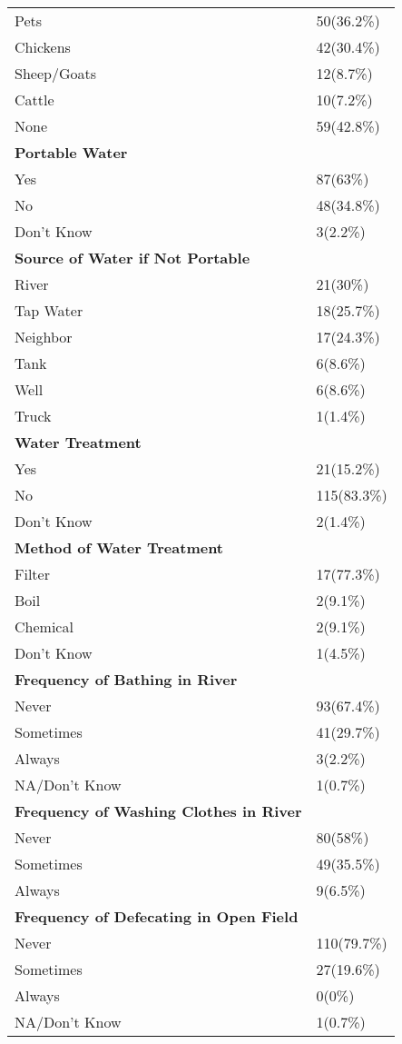 \documentclass[10pt,letterpaper]{article}
\begin{document}
\begin{longtable}{ll}
Pets & 50(36.2\%) \\
Chickens & 42(30.4\%) \\
Sheep/Goats & 12(8.7\%) \\
Cattle & 10(7.2\%) \\
None & 59(42.8\%) \\
\midrule
\textbf{Portable Water} & \\
Yes & 87(63\%) \\
No & 48(34.8\%) \\
Don't Know & 3(2.2\%) \\
\midrule
\textbf{Source of Water if Not Portable} & \\
River & 21(30\%) \\
Tap Water & 18(25.7\%) \\
Neighbor & 17(24.3\%) \\
Tank & 6(8.6\%) \\
Well & 6(8.6\%) \\
Truck & 1(1.4\%) \\
\midrule
\textbf{Water Treatment} & \\
Yes & 21(15.2\%) \\
No & 115(83.3\%) \\
Don't Know & 2(1.4\%) \\
\midrule
\textbf{Method of Water Treatment} & \\
Filter & 17(77.3\%) \\
Boil & 2(9.1\%) \\
Chemical & 2(9.1\%) \\
Don't Know & 1(4.5\%) \\
\midrule
\textbf{Frequency of Bathing in River} & \\
Never & 93(67.4\%) \\
Sometimes & 41(29.7\%) \\
Always & 3(2.2\%) \\
NA/Don't Know & 1(0.7\%) \\
\midrule
\textbf{Frequency of Washing Clothes in River} & \\
Never & 80(58\%) \\
Sometimes & 49(35.5\%) \\
Always & 9(6.5\%) \\
\midrule
\textbf{Frequency of Defecating in Open Field} & \\
Never & 110(79.7\%) \\
Sometimes & 27(19.6\%) \\
Always & 0(0\%) \\
NA/Don't Know & 1(0.7\%) \\

\end{longtable}
\end{document}
